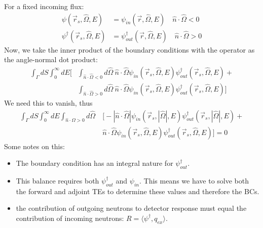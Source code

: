 \documentclass[12pt]{article}
\newcommand{\vOmega}{\ensuremath{\hat{\Omega}}}
\begin{document}
For a fixed incoming flux:
\begin{align*}
\psi(\vec{r}_s, \vOmega, E) &= \psi_{in}(\vec{r}, \vOmega, E) \quad \hat{n} \cdot \vOmega < 0 \\
\psi^{\dagger}(\vec{r}_s, \vOmega, E) &= \psi^{\dagger}_{out}(\vec{r}, \vOmega, E) \quad \hat{n} \cdot \vOmega > 0 
\end{align*}
Now, we take the inner product of the boundary conditions with the operator as the angle-normal dot product:
\begin{align*}
\int_{\Gamma} dS \int_0^{\infty} dE \bigl[&\int_{\hat{n} \cdot \vOmega < 0} d\vOmega \: \hat{n} \cdot \vOmega \psi_{in}(\vec{r}_s, \vOmega, E) \psi_{out}^{\dagger}(\vec{r}_s, \vOmega, E) +\\ 
&\int_{\hat{n} \cdot \vOmega > 0} d\vOmega \: \hat{n} \cdot \vOmega \psi_{in}(\vec{r}_s, \vOmega, E) \psi_{out}^{\dagger}(\vec{r}_s, \vOmega, E) \bigr] 
\end{align*}
We need this to vanish, thus
\begin{align*}
\int_{\Gamma} dS \int_0^{\infty} dE \int_{\hat{n} \cdot \vOmega > 0} d\vOmega \: &\bigl[-|\hat{n} \cdot \vOmega| \psi_{in}(\vec{r}_s, |\vOmega|, E) \psi_{out}^{\dagger}(\vec{r}_s, |\vOmega|, E) +\\
&\hat{n} \cdot \vOmega \psi_{in}(\vec{r}_s, \vOmega, E) \psi_{out}^{\dagger}(\vec{r}_s, \vOmega, E) \bigr] =0
\end{align*}
Some notes on this:
\begin{itemize}
\item The boundary condition  has an integral nature for $\psi_{out}^{\dagger}$.
\item This balance requires both $\psi_{out}^{\dagger}$ and $\psi_{in}$. This means we have to solve both the forward and adjoint TEs to determine these values and therefore the BCs.
\item the contribution of outgoing neutrons to detector response must equal the contribution of incoming neutrons: $R = \langle \psi^{\dagger}, q_{ex} \rangle$.
\end{itemize}
\end{document}
